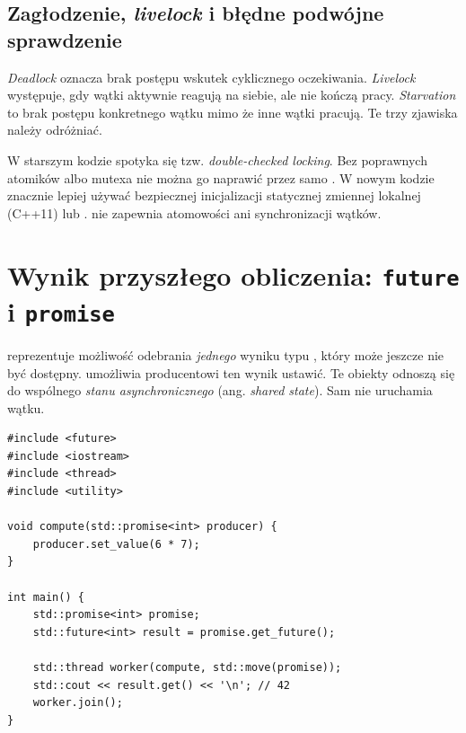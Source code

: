 \subsection{Zagłodzenie, \emph{livelock} i błędne podwójne sprawdzenie}

\emph{Deadlock} oznacza brak postępu wskutek cyklicznego oczekiwania.
\emph{Livelock} występuje, gdy wątki aktywnie reagują na siebie,
ale nie kończą pracy. \emph{Starvation} to brak postępu konkretnego
wątku mimo że inne wątki pracują. Te trzy zjawiska należy odróżniać.

W starszym kodzie spotyka się tzw. \emph{double-checked locking}.
Bez poprawnych atomików albo mutexa nie można go naprawić przez samo
. W nowym kodzie znacznie lepiej używać bezpiecznej
inicjalizacji statycznej zmiennej lokalnej (C++11) lub .
 nie zapewnia atomowości ani synchronizacji wątków.



\section{Wynik przyszłego obliczenia: \texttt{future} i \texttt{promise}}
\label{sec:future-promise}

 reprezentuje możliwość odebrania \emph{jednego}
wyniku typu , który może jeszcze nie być dostępny.
 umożliwia producentowi ten wynik ustawić.
Te obiekty odnoszą się do wspólnego \emph{stanu asynchronicznego}
(ang. \emph{shared state}). Sam  nie uruchamia wątku.

\begin{center}
\end{center}

\begin{lstlisting}[caption={Ręczne przekazanie wyniku z wątku (C++11).}]
#include <future>
#include <iostream>
#include <thread>
#include <utility>

void compute(std::promise<int> producer) {
    producer.set_value(6 * 7);
}

int main() {
    std::promise<int> promise;
    std::future<int> result = promise.get_future();

    std::thread worker(compute, std::move(promise));
    std::cout << result.get() << '\n'; // 42
    worker.join();
}
\end{lstlisting}

